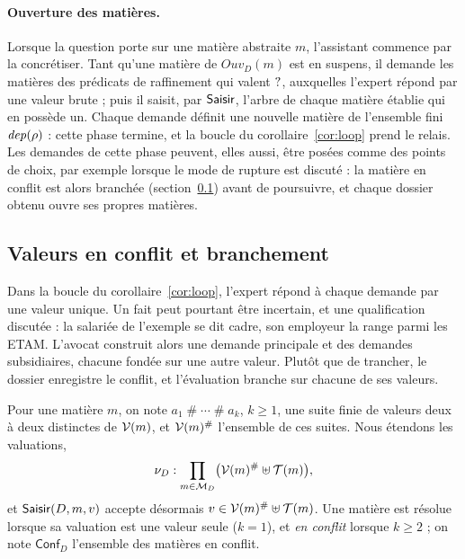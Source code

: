 \documentclass[review]{jflart}
\newcommand{\conflit}{\mathbin{\#}}
\newcommand{\Conf}{\ensuremath{\mathsf{Conf}_D}}
\newcommand{\Ouv}{\ensuremath{\mathit{Ouv}}}
\begin{document}
\paragraph{Ouverture des matières.} Lorsque la question porte sur une matière
abstraite \(m\), l'assistant commence par la concrétiser. Tant qu'une matière
de \(\Ouv_D(m)\) est en suspens, il demande les matières des prédicats de
raffinement qui valent \(\mathord{?}\), auxquelles l'expert répond par une valeur
brute ; puis il saisit, par \(\mathsf{Saisir}\), l'arbre de chaque matière établie qui
en possède un. Chaque demande définit une nouvelle matière de l'ensemble fini
\(\mathit{dep}(\rho)\) : cette phase termine, et la boucle du
corollaire~\ref{cor:loop} prend le relais. Les demandes de cette phase
peuvent, elles aussi, être posées comme des points de choix, par exemple
lorsque le mode de rupture est discuté : la matière en conflit est alors
branchée (section~\ref{sec:choix}) avant de poursuivre, et chaque dossier
obtenu ouvre ses propres matières.

\subsection{Valeurs en conflit et branchement}\label{sec:choix}

Dans la boucle du corollaire~\ref{cor:loop}, l'expert répond à chaque demande
par une valeur unique. Un fait peut pourtant être incertain, et une
qualification discutée : la salariée de l'exemple se dit cadre, son employeur
la range parmi les ETAM. L'avocat construit alors une demande principale et des
demandes subsidiaires, chacune fondée sur une autre valeur. Plutôt que de
trancher, le dossier enregistre le conflit, et l'évaluation branche sur
chacune de ses valeurs.

\begin{defi}\label{def:conflit}
Pour une matière \(m\), on note \(a_1\conflit\cdots\conflit a_k\),
\(k\geq1\), une suite finie de valeurs deux à deux distinctes de \(\mathcal{V}(m)\), et
\(\Raw(m)^{\conflit}\) l'ensemble de ces suites. Nous étendons les valuations,
\[
\nu_D:\prod_{m\in\mc M_D}\bigl(\Raw(m)^{\conflit}\uplus\mc T(m)\bigr),
\]
et \(\mathsf{Saisir}(D,m,v)\) accepte désormais \(v\in\Raw(m)^{\conflit}\uplus\mc
T(m)\). Une matière est résolue lorsque sa valuation est une valeur seule
(\(k=1\)), et \emph{en conflit} lorsque \(k\geq2\) ; on note \(\Conf\)
l'ensemble des matières en conflit.
\end{defi}
\end{document}
